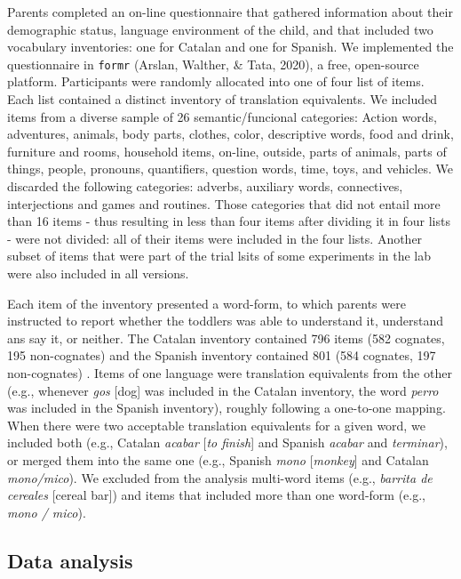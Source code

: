 \documentclass[
  english,
  man,man,floatsintext]{apa6}
\begin{document}
Parents completed an on-line questionnaire that gathered information about their demographic status, language environment of the child, and that included two vocabulary inventories: one for Catalan and one for Spanish. We implemented the questionnaire in \texttt{formr} (Arslan, Walther, \& Tata, 2020), a free, open-source platform. Participants were randomly allocated into one of four list of items. Each list contained a distinct inventory of translation equivalents. We included items from a diverse sample of 26 semantic/funcional categories: Action words, adventures, animals, body parts, clothes, color, descriptive words, food and drink, furniture and rooms, household items, on-line, outside, parts of animals, parts of things, people, pronouns, quantifiers, question words, time, toys, and vehicles. We discarded the following categories: adverbs, auxiliary words, connectives, interjections and games and routines. Those categories that did not entail more than 16 items - thus resulting in less than four items after dividing it in four lists - were not divided: all of their items were included in the four lists. Another subset of items that were part of the trial lsits of some experiments in the lab were also included in all versions.

Each item of the inventory presented a word-form, to which parents were instructed to report whether the toddlers was able to understand it, understand ans say it, or neither. The Catalan inventory contained 796 items (582 cognates, 195 non-cognates) and the Spanish inventory contained 801 (584 cognates, 197 non-cognates) . Items of one language were translation equivalents from the other (e.g., whenever \emph{gos} {[}dog{]} was included in the Catalan inventory, the word \emph{perro} was included in the Spanish inventory), roughly following a one-to-one mapping. When there were two acceptable translation equivalents for a given word, we included both (e.g., Catalan \emph{acabar} {[}\emph{to finish}{]} and Spanish \emph{acabar} and \emph{terminar}), or merged them into the same one (e.g., Spanish \emph{mono} {[}\emph{monkey}{]} and Catalan \emph{mono/mico}). We excluded from the analysis multi-word items (e.g., \emph{barrita de cereales} {[}cereal bar{]}) and items that included more than one word-form (e.g., \emph{mono / mico}).

\hypertarget{data-analysis}{%
\subsection{Data analysis}\label{data-analysis}}
\end{document}
